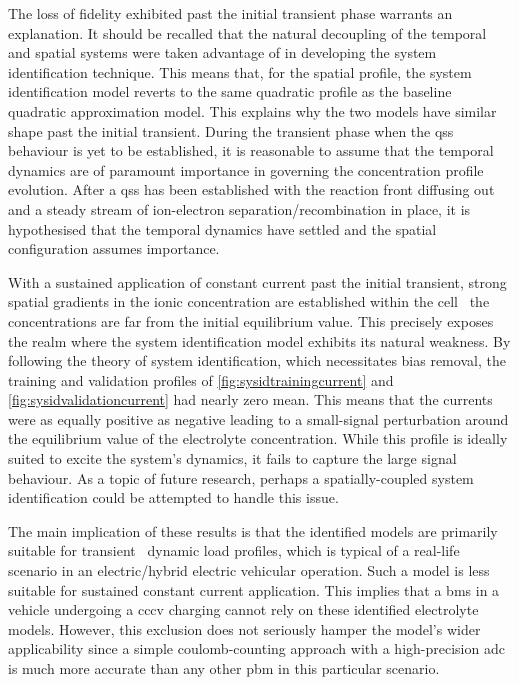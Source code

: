 The  loss  of fidelity  exhibited  past  the  initial transient  phase  warrants
an  explanation. It  should  be  recalled that  the  natural  decoupling of  the
temporal and  spatial systems were taken  advantage of in developing  the system
identification technique. This  means that, for the spatial  profile, the system
identification  model reverts  to the  same  quadratic profile  as the  baseline
quadratic approximation  model. This  explains why the  two models  have similar
shape past the initial transient. During  the transient phase when the \gls{qss}
behaviour is yet to be established, it is reasonable to assume that the temporal
dynamics  are of  paramount importance  in governing  the concentration  profile
evolution.  After a  \gls{qss}  has  been established  with  the reaction  front
diffusing out  and a steady  stream of ion-electron  separation/recombination in
place,  it is  hypothesised  that the  temporal dynamics  have  settled and  the
spatial configuration assumes importance.

With a  sustained application  of constant current  past the  initial transient,
strong spatial gradients  in the ionic concentration are  established within the
cell \ie~the  concentrations are far from the initial  equilibrium value. This
precisely  exposes the  realm  where the  system  identification model  exhibits
its  natural  weakness.  By  following  the  theory  of  system  identification,
which  necessitates   bias  removal,   the  training  and   validation  profiles
of \cref{fig:sysidtrainingcurrent}   and \cref{fig:sysidvalidationcurrent}   had
nearly  zero mean.  This means  that the  currents were  as equally  positive as
negative leading to a small-signal  perturbation around the equilibrium value of
the electrolyte  concentration. While this  profile is ideally suited  to excite
the system's  dynamics, it  fails to  capture the large  signal behaviour.  As a
topic  of future  research,  perhaps a  spatially-coupled system  identification
could be attempted to handle this issue.

The  main  implication of  these  results  is  that  the identified  models  are
primarily suitable for  transient \ie~dynamic load profiles,  which is typical
of a real-life scenario in an electric/hybrid electric vehicular operation. Such
a  model is  less  suitable  for sustained  constant  current application.  This
implies that  a \gls{bms} in a  vehicle undergoing a \gls{cccv}  charging cannot
rely on  these identified electrolyte  models. However, this exclusion  does not
seriously hamper the model's wider applicability since a simple coulomb-counting
approach with  a high-precision \gls{adc} is  much more accurate than  any other
\gls{pbm} in this particular scenario.

